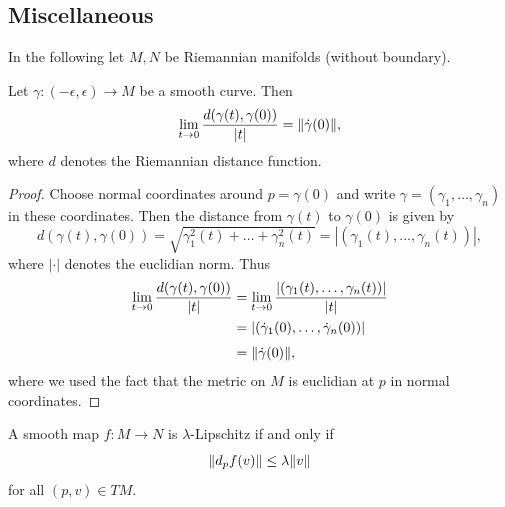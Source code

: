 \subsection{Miscellaneous}
In the following let $M,N$ be Riemannian manifolds (without boundary).

\begin{lemma}
    \label{riem_mnf:lem:difference_quotient_of_distance_function}
    Let $\gamma \colon (-\epsilon,\epsilon) \to M$ be a smooth curve. Then 
    \[
    \lim_{t \to 0} \frac{d(\gamma(t),\gamma(0))}{\lvert t\rvert} = \lVert\dot{\gamma}(0)\rVert,
    \]
    where $d$ denotes the Riemannian distance function.
\end{lemma}

\begin{proof}
    Choose normal coordinates around $p = \gamma(0)$ and write $\gamma = (\gamma_1,\ldots,\gamma_n)$ in these coordinates. Then the distance from $\gamma(t)$ to $\gamma(0)$ is given by 
    \[
    d(\gamma(t),\gamma(0)) = \sqrt{\gamma_1^2(t) + \ldots + \gamma_n^2(t)} = |(\gamma_1(t),\ldots,\gamma_n(t))|,
    \]
    where $|\cdot|$ denotes the euclidian norm. Thus 
    \begin{align*}
        \lim_{t \to 0} \frac{d(\gamma(t),\gamma(0))}{\lvert t\rvert} & = \lim_{t \to 0} \frac{|(\gamma_1(t),\ldots,\gamma_n(t))|}{\lvert t\rvert} \\
        &= |(\dot{\gamma}_1(0),\ldots,\dot{\gamma}_n(0))| \\[3pt]
        &= \lVert\dot{\gamma}(0)\rVert,
    \end{align*}
    where we used the fact that the metric on $M$ is euclidian at $p$ in normal coordinates.
\end{proof}

\begin{lemma}
    A smooth map $f \colon M \to N$ is $\lambda$-Lipschitz if and only if 
    \[
    \lVert d_pf(v)\rVert \leq \lambda \lVert v\rVert
    \]
    for all $(p,v) \in TM$.
\end{lemma}

